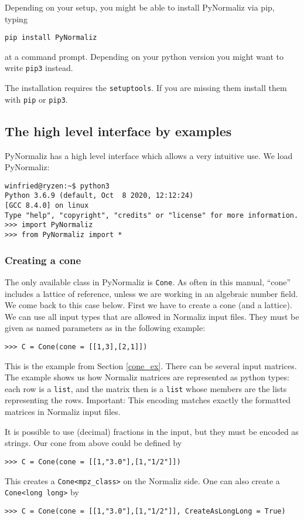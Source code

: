 \documentclass[12pt,a4paper]{scrartcl}
\theoremstyle{definition}
\begin{document}
\begin{small}
Depending on your setup, you might be able to install PyNormaliz via pip, typing
\begin{Verbatim}
pip install PyNormaliz
\end{Verbatim}
at a command prompt. Depending on your python version you might want to write \verb|pip3| instead.

The installation requires the \verb|setuptools|. If you are missing them install them with \verb|pip| or \verb|pip3|.


\subsection{The high level interface by examples}

PyNormaliz has a high level interface which allows a very intuitive use. We load PyNormaliz:
\begin{Verbatim}
winfried@ryzen:~$ python3
Python 3.6.9 (default, Oct  8 2020, 12:12:24) 
[GCC 8.4.0] on linux
Type "help", "copyright", "credits" or "license" for more information.
>>> import PyNormaliz
>>> from PyNormaliz import *
\end{Verbatim}

\subsubsection{Creating a cone}

The only available class in PyNormaliz is \verb|Cone|. As often in this manual, ``cone'' includes a lattice of reference, unless we are working in an algebraic number field. We come back to this case below. First we have to create a cone (and a lattice). We can use all input types that are allowed in Normaliz input files. They must be given as named parameters as in the following example:
\begin{Verbatim}
>>> C = Cone(cone = [[1,3],[2,1]])
\end{Verbatim}
This is the example from Section \ref{cone_ex}. There can be several input matrices. The example shows us how Normaliz matrices are represented as python types: each row is a \verb|list|, and the matrix then is a \verb|list| whose members are the lists representing the rows. Important: This encoding matches exactly the formatted matrices in Normaliz input files.

It is possible to use (decimal) fractions in the input, but they must be encoded as strings. Our cone from above could be defined by
\begin{Verbatim}
>>> C = Cone(cone = [[1,"3.0"],[1,"1/2"]])
\end{Verbatim}
This creates a \verb|Cone<mpz_class>| on the Normaliz side. One can also create a \verb|Cone<long long>| by
\begin{Verbatim}
>>> C = Cone(cone = [[1,"3.0"],[1,"1/2"]], CreateAsLongLong = True)
\end{Verbatim}


\end{small}
\end{document}
